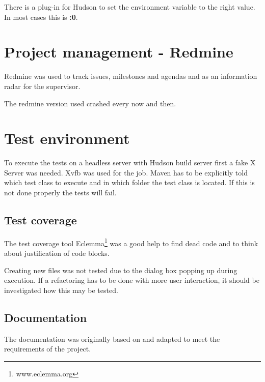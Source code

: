There is a plug-in for Hudson to set the environment variable to
the right value. In most cases this is \textbf{:0}.

\section{Project management - Redmine}

Redmine was used to track issues, milestones and agendas and as an information 
radar for the supervisor.

The redmine version used crashed every now and then. 

\section{Test environment}

To execute the tests on a headless server with Hudson build server first a fake
X Server was needed. Xvfb was used for the job. Maven has to be
explicitly told which test class to execute and in which folder the test class
is located. If this is not done properly the tests will fail.

\subsection{Test coverage}

The test coverage tool Eclemma\footnote{www.eclemma.org} was a good help to find dead code and to think 
about justification of code blocks. 

Creating new files was not tested due to the dialog box popping up during 
execution. If a refactoring has to be done with more user interaction, it
should be investigated how this may be tested. 

\subsection{Documentation}

The documentation was originally based on \cite{AV08} and adapted to meet the 
requirements of the project.

